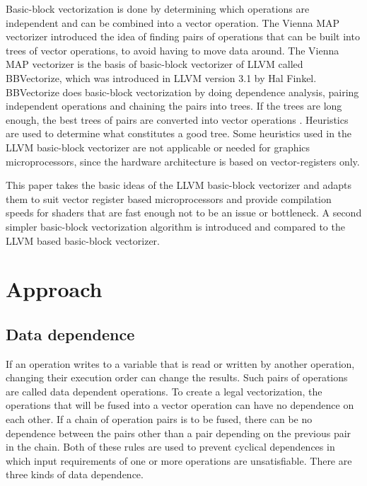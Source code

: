 \documentclass[12pt,a4paper,onecolumn,twoside,openright]{report}
\begin{document}
Basic-block vectorization is done by determining which operations are independent and can be combined into a vector operation. The Vienna MAP vectorizer \cite{lorenz2005vectorization} introduced the idea of finding pairs of operations that can be built into trees of vector operations, to avoid having to move data around. The Vienna MAP vectorizer is the basis of basic-block vectorizer of LLVM called BBVectorize\cite{finkel2012bbvectorize}, which was introduced in LLVM version 3.1 by Hal Finkel. BBVectorize does basic-block vectorization by doing dependence analysis, pairing independent operations and chaining the pairs into trees. If the trees are long enough, the best trees of pairs are converted into vector operations \cite{finkel2012bbvectorize}. Heuristics are used to determine what constitutes a good tree. Some heuristics used in the LLVM basic-block vectorizer are not applicable or needed for graphics microprocessors, since the hardware architecture is based on vector-registers only.


This paper takes the basic ideas of the LLVM basic-block vectorizer and adapts them to suit vector register based microprocessors and provide compilation speeds for shaders that are fast enough not to be an issue or bottleneck.
A second simpler basic-block vectorization algorithm is introduced and compared to the LLVM based basic-block vectorizer.


\chapter{Approach}
 \label{chap:approach}

\section{Data dependence}
If an operation writes to a variable that is read or written by another operation, changing their execution order can change the results. Such pairs of operations are called data dependent operations. 
To create a legal vectorization, the operations that will be fused into a vector operation can have no dependence on each other. If a chain of operation pairs is to be fused, there can be no dependence between the pairs other than a pair depending on the previous pair in the chain. Both of these rules are used to prevent cyclical dependences in which input requirements of one or more operations are unsatisfiable.
There are three kinds of data dependence\cite{aho2007compilers}\cite{kuck1981dependence}.
\end{document}
